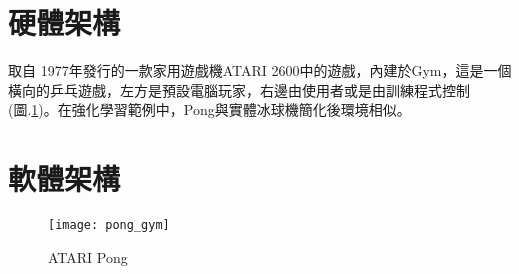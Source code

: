 \section{硬體架構}
 取自 1977年發行的一款家用遊戲機ATARI 2600中的遊戲，內建於Gym，這是一個橫向的乒乓遊戲，左方是預設電腦玩家，右邊由使用者或是由訓練程式控制(圖.\ref{fig.pong})。在強化學習範例中，Pong與實體冰球機簡化後環境相似。\\
 
 \section{軟體架構}
\begin{figure}[hbt!]
\begin{center}
\texttt{[image: pong\_gym]}
\caption{\Large ATARI Pong}\label{fig.pong}
\end{center}
\end{figure} 

\newpage
